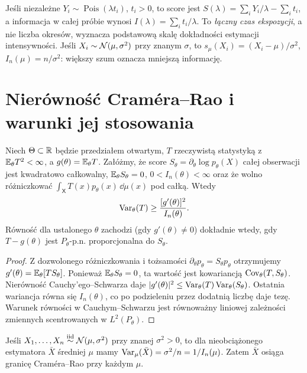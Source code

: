 \begin{przyklad}
Jeśli niezależne $Y_i\sim\operatorname{Pois}(\lambda t_i)$,
$t_i>0$, to score jest $S(\lambda)=\sum_iY_i/\lambda-
\sum_it_i$, a informacja w całej próbie wynosi
$I(\lambda)=\sum_it_i/\lambda$. To \emph{łączny czas ekspozycji},
a nie liczba okresów, wyznacza podstawową skalę dokładności
estymacji intensywności. Jeśli $X_i\sim\mathcal N(\mu,\sigma^2)$
przy znanym $\sigma$, to $s_\mu(X_i)=(X_i-\mu)/\sigma^2$,
$I_n(\mu)=n/\sigma^2$: większy szum oznacza mniejszą informację.
\end{przyklad}

\section{Nierówność Craméra--Rao i warunki jej stosowania}
\begin{twierdzenie}
\label{thm:cramer-rao}
Niech $\Theta\subset\mathbb R$ będzie przedziałem otwartym,
$T$ rzeczywistą statystyką z $\mathbb E_\theta T^2<\infty$,
a $g(\theta)=\mathbb E_\theta T$. Załóżmy, że score
$S_\theta=\partial_\theta\log p_\theta(X)$ całej obserwacji
jest kwadratowo całkowalny, $\mathbb E_\theta S_\theta=0$,
$0<I_n(\theta)<\infty$ oraz że wolno różniczkować
$\int_{\mathsf X} T(x)p_\theta(x)\,\dd\mu(x)$ pod całką. Wtedy
\[
\operatorname{Var}_\theta(T)\ge\frac{[g'(\theta)]^2}{I_n(\theta)}.
\]
Równość dla ustalonego $\theta$ zachodzi (gdy $g'(\theta)\ne0$)
dokładnie wtedy, gdy $T-g(\theta)$ jest $P_\theta$-p.n.
proporcjonalna do $S_\theta$.
\end{twierdzenie}
\begin{proof}
Z dozwolonego różniczkowania i tożsamości
$\partial_\theta p_\theta=S_\theta p_\theta$ otrzymujemy
$g'(\theta)=\mathbb E_\theta[T S_\theta]$.
Ponieważ $\mathbb E_\theta S_\theta=0$, ta wartość jest kowariancją
$\operatorname{Cov}_\theta(T,S_\theta)$. Nierówność Cauchy'ego--Schwarza
daje $|g'(\theta)|^2\le\operatorname{Var}_\theta(T)\operatorname{Var}_\theta(S_\theta)$.
Ostatnia wariancja równa się $I_n(\theta)$, co po podzieleniu
przez dodatnią liczbę daje tezę. Warunek równości w
Cauchym--Schwarzu jest równoważny liniowej zależności
zmiennych scentrowanych w $L^2(P_\theta)$.
\end{proof}

\begin{wniosek}
Jeśli $X_1,\ldots,X_n\mathrel{\overset{\mathrm{iid}}\sim}\mathcal N(\mu,\sigma^2)$ przy
znanej $\sigma^2>0$, to dla nieobciążonego estymatora
$\bar X$ średniej $\mu$ mamy
$\operatorname{Var}_\mu(\bar X)=\sigma^2/n=1/I_n(\mu)$.
Zatem $\bar X$ osiąga granicę Craméra--Rao przy każdym $\mu$.
\end{wniosek}

